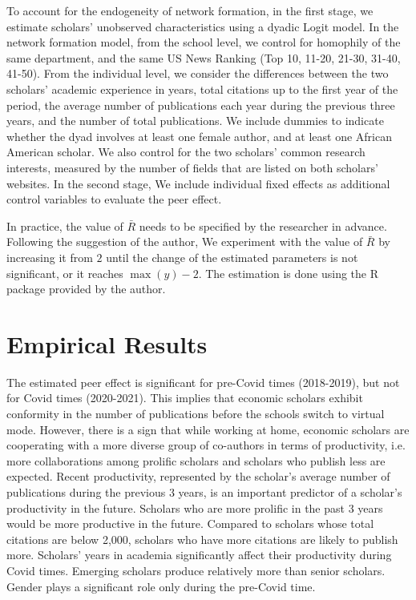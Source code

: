 To account for the endogeneity of network formation, in the first stage, we estimate scholars' unobserved characteristics using a dyadic Logit model. In the network formation model, from the school level, we control for homophily of the same department, and the same US News Ranking (Top 10, 11-20, 21-30, 31-40, 41-50). From the individual level, we consider the differences between the two scholars' academic experience in years, total citations up to the first year of the period, the average number of publications each year during the previous three years, and the number of total publications. We include dummies to indicate whether the dyad involves at least one female author, and at least one African American scholar. We also control for the two scholars' common research interests, measured by the number of fields that are listed on both scholars' websites. In the second stage, We include individual fixed effects as additional control variables to evaluate the peer effect.

In practice, the value of $\bar{R}$ needs to be specified by the researcher in advance. Following the suggestion of the author, We experiment with the value of $\bar{R}$ by increasing it from $2$ until the change of the estimated parameters is not significant, or it reaches $\max(y)-2$. The estimation is done using the R package provided by the author.

\section{Empirical Results}

The estimated peer effect is significant for pre-Covid times (2018-2019), but not for Covid times (2020-2021). This implies that economic scholars exhibit conformity in the number of publications before the schools switch to virtual mode. However, there is a sign that while working at home, economic scholars are cooperating with a more diverse group of co-authors in terms of productivity, i.e. more collaborations among prolific scholars and scholars who publish less are expected. Recent productivity, represented by the scholar's average number of publications during the previous 3 years, is an important predictor of a scholar's productivity in the future. Scholars who are more prolific in the past 3 years would be more productive in the future. Compared to scholars whose total citations are below 2,000, scholars who have more citations are likely to publish more. Scholars' years in academia significantly affect their productivity during Covid times. Emerging scholars produce relatively more than senior scholars. Gender plays a significant role only during the pre-Covid time.

